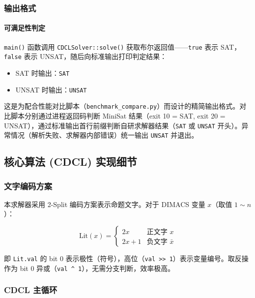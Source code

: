 \documentclass[12pt,a4paper]{article}
\begin{document}
\subsubsection{输出格式}

\paragraph{可满足性判定}

\texttt{main()} 函数调用 \texttt{CDCLSolver::solve()} 获取布尔返回值——\texttt{true} 表示 SAT，\texttt{false} 表示 UNSAT，随后向标准输出打印判定结果：

\begin{itemize}[label=$\bullet$]
    \item SAT 时输出：\texttt{SAT}
    \item UNSAT 时输出：\texttt{UNSAT}
\end{itemize}

这是为配合性能对比脚本（\texttt{benchmark\_compare.py}）而设计的精简输出格式。对比脚本分别通过进程返回码判断 MiniSat 结果（exit 10 = SAT, exit 20 = UNSAT），通过标准输出首行前缀判断自研求解器结果（\texttt{SAT} 或 \texttt{UNSAT} 开头）。异常情况（解析失败、求解器内部错误）统一输出 \texttt{UNSAT} 并退出。

\subsection{核心算法 (CDCL) 实现细节}

\subsubsection{文字编码方案}

本求解器采用 2-Split 编码方案表示命题文字。对于 DIMACS 变量 $x$（取值 $1 \sim n$）：

\[
\text{Lit}(x) = 
\begin{cases}
2x     & \text{正文字 } x \\
2x + 1 & \text{负文字 } \bar{x}
\end{cases}
\]

即 \texttt{Lit.val} 的 bit 0 表示极性（符号），高位（\texttt{val >> 1}）表示变量编号。取反操作为 bit 0 异或（\texttt{val \^{} 1}），无需分支判断，效率极高。

\subsubsection{CDCL 主循环}
\end{document}
